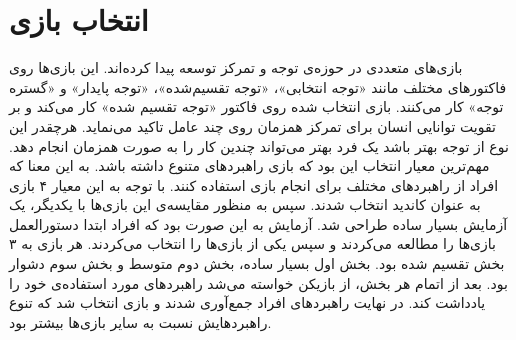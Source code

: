 \documentclass[twoside, a4paper,11pt]{book}
\numberwithin{equation}{chapter}
\numberwithin{table}{chapter}
\numberwithin{figure}{chapter}
\numberwithin{equation}{chapter}
\begin{document}
\section{انتخاب بازی}

بازی‌های متعددی در حوزه‌ی توجه و تمرکز توسعه پیدا کرده‌اند. این بازی‌ها روی فاکتورهای مختلف مانند «توجه انتخابی»، «توجه تقسیم‌شده»، «توجه پایدار» و «گستره توجه» کار می‌کنند. بازی انتخاب شده روی فاکتور «توجه تقسیم شده» کار می‌کند و بر تقویت توانایی انسان برای تمرکز همزمان روی چند عامل تاکید می‌نماید. هرچقدر این نوع از توجه بهتر باشد یک فرد بهتر می‌تواند چندین کار را به صورت همزمان انجام دهد. 
مهم‌ترین معیار انتخاب این بود که بازی راهبرد‌های متنوع داشته باشد. به این معنا که افراد از راهبردهای مختلف برای انجام بازی استفاده کنند. با توجه به این معیار ۴ بازی به عنوان کاندید انتخاب شدند. سپس به منظور مقایسه‌ی این بازی‌ها با یکدیگر، یک آزمایش بسیار ساده طراحی شد. آزمایش به این صورت بود که افراد ابتدا دستورالعمل بازی‌ها را مطالعه می‌کردند و سپس یکی از بازی‌ها را انتخاب می‌کردند. هر بازی به ۳ بخش تقسیم شده بود. بخش اول بسیار ساده، بخش دوم متوسط و بخش سوم دشوار بود. بعد از اتمام هر بخش، از بازیکن خواسته می‌شد راهبردهای مورد استفاده‌ی خود را یادداشت کند. در نهایت راهبردهای افراد جمع‌آوری شدند و بازی انتخاب شد که تنوع راهبردهایش نسبت به سایر بازی‌ها بیشتر بود.
\end{document}

